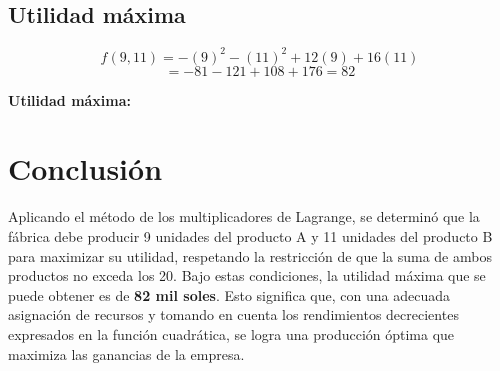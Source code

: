 \documentclass{article}
\begin{document}
\subsection*{Utilidad máxima}
\[
f(9, 11) = -(9)^2 - (11)^2 + 12(9) + 16(11)
\]
\[
= -81 - 121 + 108 + 176 = 82
\]

\textbf{Utilidad máxima: } 

\section*{Conclusión}
Aplicando el método de los multiplicadores de Lagrange, se determinó que la fábrica debe producir 9 unidades del producto A y 11 unidades del producto B para maximizar su utilidad, respetando la restricción de que la suma de ambos productos no exceda los 20. Bajo estas condiciones, la utilidad máxima que se puede obtener es de \textbf{82 mil soles}. Esto significa que, con una adecuada asignación de recursos y tomando en cuenta los rendimientos decrecientes expresados en la función cuadrática, se logra una producción óptima que maximiza las ganancias de la empresa.
\end{document}
